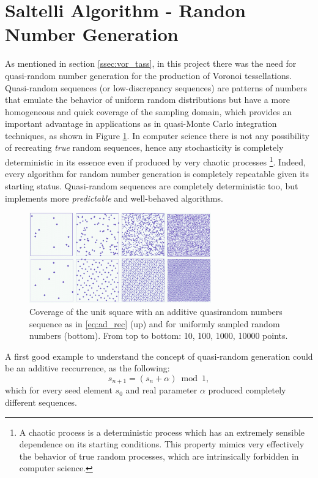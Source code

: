\section{Saltelli Algorithm - Randon Number Generation} \label{ssec:saltelli}
    As mentioned in section \ref{ssec:vor_tass}, in this project there was the need for quasi-random number generation for the production of Voronoi tessellations. Quasi-random sequences (or low-discrepancy sequences) are patterns of numbers that emulate the behavior of uniform random distributions but have a more homogeneous and quick coverage of the sampling domain, which provides an important advantage in applications as in quasi-Monte Carlo integration techniques, as shown in Figure \ref{fig:Subrandom_2D}. In computer science there is not any possibility of recreating \textit{true} random sequences, hence any stochasticity is completely deterministic in its essence even if produced by very chaotic processes \footnote{A chaotic process is a deterministic process which has an extremely sensible dependence on its starting conditions. This property mimics very effectively the behavior of true random processes, which are intrinsically forbidden in computer science.}. Indeed, every algorithm for random number generation is completely repeatable given its starting status. Quasi-random sequences are completely deterministic too, but implements more \textit{predictable} and well-behaved algorithms.

    \begin{figure}
        \centering
        \includegraphics[width = 0.7\textwidth]{images/Subrandom_2D}
        \caption{Coverage of the unit square with an additive quasirandom numbers sequence as in \ref{eq:ad_rec} (up) and for uniformly sampled random numbers (bottom). From top to bottom: 10, 100, 1000, 10000 points.}
        \label{fig:Subrandom_2D}
    \end{figure}

    A first good example to understand the concept of quasi-random generation could be an additive reccurrence, as the following:
    \begin{equation}
        s_{n+1} = ( s_n + \alpha ) \bmod 1,
        \label{eq:ad_rec}
    \end{equation}
    which for every seed element $s_0$ and real parameter $\alpha$ produced completely different sequences.

